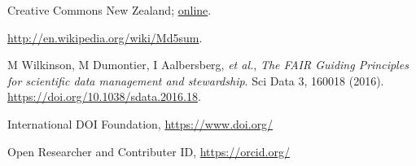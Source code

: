 \begin{thebibliography}{9}
 Creative Commons New Zealand; \href{https://www.tohatoha.org.nz/creative-commons/}{online}. 

 \url{http://en.wikipedia.org/wiki/Md5sum}. 

M Wilkinson, M Dumontier, I Aalbersberg, \textit{et al.}, \textit{The FAIR Guiding Principles for scientific data management and stewardship}. Sci Data 3, 160018 (2016). \url{https://doi.org/10.1038/sdata.2016.18}.

 International DOI Foundation, \url{https://www.doi.org/}

 Open Researcher and Contributer ID, \url{https://orcid.org/}

\end{thebibliography}
\endgroup